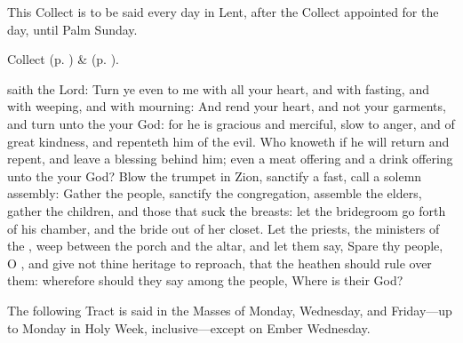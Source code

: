 \begin{rubric}
This Collect is to be said every day in Lent, after the Collect appointed for the day, until Palm Sunday.
\end{rubric}
\begin{rubric}
     Collect  (p. \pageref{SPSaints}) \&   (p. \pageref{SPLivingDeparted}).
\end{rubric}
 saith the Lord: Turn ye even to me with all your heart, and with fasting, and with weeping, and with mourning: And rend your heart, and not your garments, and turn unto the  your God: for he is gracious and merciful, slow to anger, and of great kindness, and repenteth him of the evil. Who knoweth if he will return and repent, and leave a blessing behind him; even a meat offering and a drink offering unto the  your God? Blow the trumpet in Zion, sanctify a fast, call a solemn assembly: Gather the people, sanctify the congregation, assemble the elders, gather the children, and those that suck the breasts: let the bridegroom go forth of his chamber, and the bride out of her closet. Let the priests, the ministers of the , weep between the porch and the altar, and let them say, Spare thy people, O , and give not thine heritage to reproach, that the heathen should rule over them: wherefore should they say among the people, Where is their God?

\begin{rubric}
    The following Tract is said in the Masses of Monday, Wednesday, and Friday---up to Monday in Holy Week, inclusive---except on Ember Wednesday.
\end{rubric}

